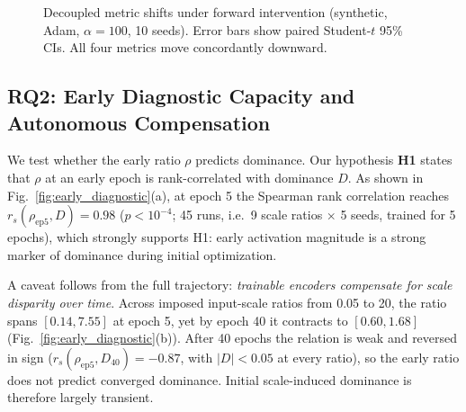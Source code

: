 \documentclass[conference]{IEEEtran}
\begin{document}
\begin{figure}[!t]
\centering
{}
\caption{Decoupled metric shifts under forward intervention (synthetic, Adam, $\alpha = 100$, 10 seeds). Error bars show paired Student-$t$ 95\% CIs. All four metrics move concordantly downward.}
\label{fig:phase1_decoupled}
\end{figure}

\subsection{RQ2: Early Diagnostic Capacity and Autonomous Compensation}
We test whether the early ratio $\rho$ predicts dominance. Our hypothesis \textbf{H1} states that $\rho$ at an early epoch is rank-correlated with dominance $D$. %
As shown in Fig.~\ref{fig:early_diagnostic}(a), at epoch 5 the Spearman rank correlation reaches $r_s(\rho_{\text{ep5}}, D) = 0.98$ ($p < 10^{-4}$; 45 runs, i.e.\ 9 scale ratios $\times$ 5 seeds, trained for 5 epochs), which strongly supports H1: early activation magnitude is a strong marker of dominance during initial optimization.

A caveat follows from the full trajectory: \textit{trainable encoders compensate for scale disparity over time}. Across imposed input-scale ratios from 0.05 to 20, the ratio spans $[0.14, 7.55]$ at epoch 5, yet by epoch 40 it contracts to $[0.60, 1.68]$ (Fig.~\ref{fig:early_diagnostic}(b)). After 40 epochs the relation is weak and reversed in sign ($r_s(\rho_{\text{ep5}}, D_{40}) = -0.87$, with $|D| < 0.05$ at every ratio), so the early ratio does not predict converged dominance. Initial scale-induced dominance is therefore largely transient.
\end{document}
